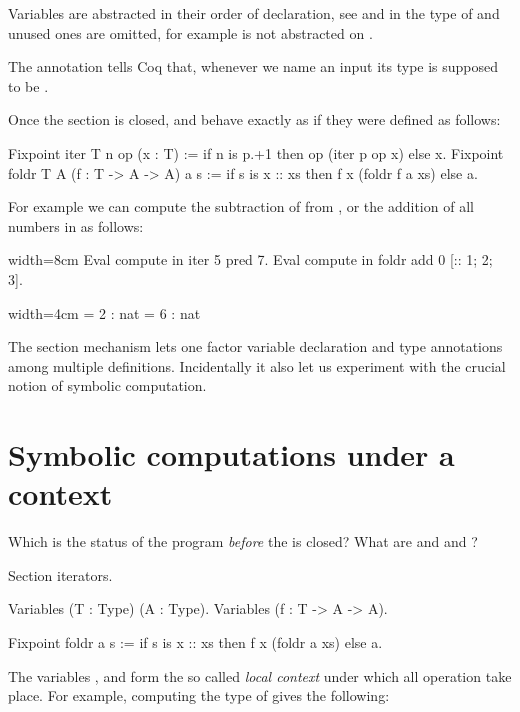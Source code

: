 Variables are abstracted in their order of declaration, see  and 
in the type of  and unused ones are omitted, for example 
is not abstracted on .

The  annotation tells Coq that, whenever we name
an input  its type is supposed to be .

Once the section is closed,  and  behave exactly as
if they were defined as follows:

\begin{coq}{}{}
Fixpoint iter T n op (x : T) :=
  if n is p.+1 then op (iter p op x) else x.
Fixpoint foldr T A (f : T -> A -> A) a s :=
  if s is x :: xs then f x (foldr f a xs) else a.
\end{coq}

For example we can compute the subtraction of  from , or the 
addition of all numbers in \C{[:: 1; 2; 3]}
as follows:

\begin{coq}{}{width=8cm}
Eval compute in iter 5 pred 7.
Eval compute in foldr add 0 [:: 1; 2; 3].
\end{coq}
\begin{coqout}{}{width=4cm}
 = 2 : nat
 = 6 : nat
\end{coqout}

The section mechanism lets one factor variable declaration and type
annotations among multiple definitions.  Incidentally it also let us
experiment with the crucial notion of symbolic computation.

\section{Symbolic computations under a context}

Which is the status of the  program \emph{before} the
 is closed?  What are  and  and ?

\begin{coq}{}{}
Section iterators.

Variables (T : Type) (A : Type).
Variables (f : T -> A -> A).

Fixpoint foldr a s :=
  if s is x :: xs then f x (foldr a xs) else a.
\end{coq}

The variables ,  and  form the so called
\emph{local context} under which all operation take place.
For example, computing the type of  gives the following:

